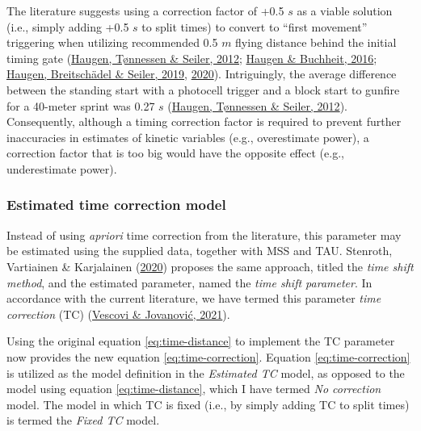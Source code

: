 \documentclass[fleqn,10pt,lineno]{wlpeerj} %
\begin{document}
The literature suggests using a correction factor of +0.5 \(s\) as a viable solution (i.e., simply adding +0.5 \(s\) to split times) to convert to ``first movement'' triggering when utilizing recommended 0.5 \(m\) flying distance behind the initial timing gate (\protect\hyperlink{ref-haugenDifferenceStartImpact2012}{Haugen, Tønnessen \& Seiler, 2012}; \protect\hyperlink{ref-haugenSprintRunningPerformance2016}{Haugen \& Buchheit, 2016}; \protect\hyperlink{ref-haugenSprintMechanicalVariables2019}{Haugen, Breitschädel \& Seiler, 2019}, \protect\hyperlink{ref-haugenSprintMechanicalProperties2020}{2020}). Intriguingly, the average difference between the standing start with a photocell trigger and a block start to gunfire for a 40-meter sprint was 0.27 \(s\) (\protect\hyperlink{ref-haugenDifferenceStartImpact2012}{Haugen, Tønnessen \& Seiler, 2012}). Consequently, although a timing correction factor is required to prevent further inaccuracies in estimates of kinetic variables (e.g., overestimate power), a correction factor that is too big would have the opposite effect (e.g., underestimate power).

\hypertarget{estimated-time-correction-model}{%
\subsubsection{Estimated time correction model}\label{estimated-time-correction-model}}

Instead of using \emph{apriori} time correction from the literature, this parameter may be estimated using the supplied data, together with MSS and TAU. Stenroth, Vartiainen \& Karjalainen (\protect\hyperlink{ref-stenrothForcevelocityProfilingIce2020}{2020}) proposes the same approach, titled the \emph{time shift method}, and the estimated parameter, named the \emph{time shift parameter}. In accordance with the current literature, we have termed this parameter \emph{time correction} (TC) (\protect\hyperlink{ref-vescoviSprintMechanicalCharacteristics2021}{Vescovi \& Jovanović, 2021}).

Using the original equation \eqref{eq:time-distance} to implement the TC parameter now provides the new equation \eqref{eq:time-correction}. Equation \eqref{eq:time-correction} is utilized as the model definition in the \emph{Estimated TC} model, as opposed to the model using equation \eqref{eq:time-distance}, which I have termed \emph{No correction} model. The model in which TC is fixed (i.e., by simply adding TC to split times) is termed the \emph{Fixed TC} model.
\end{document}
